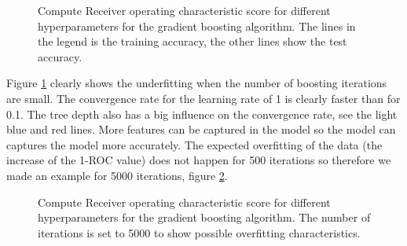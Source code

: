 \documentclass[a4paper,12pt]{article}
\begin{document}
{\begin{figure}[H]
\hfill
{}
\hfill
\caption{Compute Receiver operating characteristic score for different hyperparameters for the gradient boosting algorithm. The lines in the legend is the training accuracy, the other lines show the test accuracy. }
\label{Q41a}
\end{figure}
Figure \ref{Q41a} clearly shows the underfitting when the number of boosting iterations are small. The convergence rate for the learning rate of 1 is clearly faster than for 0.1. The tree depth also has a big influence on the convergence rate, see the light blue and red lines. More features can be captured in the model so the model can captures the model more accurately. The expected overfitting of the data (the increase of the 1-ROC value) does not happen for 500 iterations so therefore we made an example for 5000 iterations, figure \ref{Q41b}. 
\begin{figure}[H]
\hfill
{}
\hfill
\caption{Compute Receiver operating characteristic score for different hyperparameters for the gradient boosting algorithm. The number of iterations is set to 5000 to show possible overfitting characteristics.}
\label{Q41b}
\end{figure}

}
\end{document}
